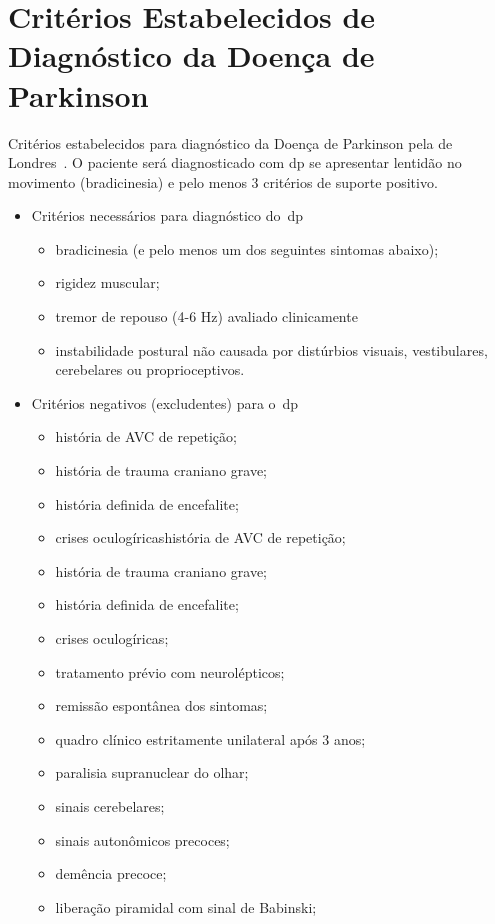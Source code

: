 \chapter{Critérios Estabelecidos de Diagnóstico da Doença de Parkinson} \label{apendice:diagnostico_parkinson}
Critérios estabelecidos para diagnóstico da Doença de Parkinson pela  de Londres~\cite{national2006parkinson}. O paciente será diagnosticado com \ac{dp} se apresentar lentidão no movimento (bradicinesia) e pelo menos 3 critérios de suporte positivo.
\begin{itemize}
	\item Critérios necessários para diagnóstico do~\ac{dp}	
		\begin{itemize}
			\item bradicinesia (e pelo menos um dos seguintes sintomas abaixo);
			\item rigidez muscular;
			\item tremor de repouso (4-6 Hz) avaliado clinicamente
			\item instabilidade postural não causada por distúrbios visuais, vestibulares, cerebelares ou proprioceptivos.
		\end{itemize}
	\item Critérios negativos (excludentes) para o~\ac{dp}
		\begin{itemize}
			\item história de AVC de repetição;
			\item história de trauma craniano grave;
			\item história definida de encefalite;
			\item crises oculogíricashistória de AVC de repetição;
			\item história de trauma craniano grave;
			\item história definida de encefalite;
			\item crises oculogíricas;
			\item tratamento prévio com neurolépticos;
			\item remissão espontânea dos sintomas;
			\item quadro clínico estritamente unilateral após 3 anos;
			\item paralisia supranuclear do olhar;
			\item sinais cerebelares;
			\item sinais autonômicos precoces;
			\item demência precoce;
			\item liberação piramidal com sinal de Babinski;

\end{itemize}
\end{itemize}
